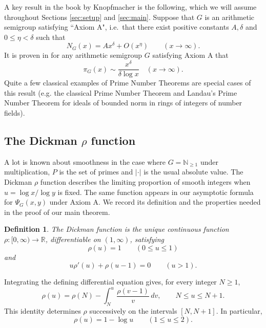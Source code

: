 \documentclass[a4paper]{amsart}
\newtheorem{definition}{Definition}[section]
\begin{document}
        A key result in the book by Knopfmacher \cite{knopfmacher2015abstract} is the following, which we will assume throughout Sections \ref{sec:setup} and \ref{sec:main}. Suppose that $G$ is an arithmetic semigroup satisfying ``Axiom A", i.e.\ that there exist positive constants $A,\delta$ and $0\leq \eta < \delta$ such that 
        \begin{equation}\label{axiom}
        N_G(x) = Ax^{\delta} + O(x^{\eta})\qquad(x\to\infty).
        \end{equation}
        It is proven in \cite[Chapter VI]{knopfmacher2015abstract} for any arithmetic semigroup $G$ satisfying Axiom A that
        \begin{equation}\label{primecounting}
    \pi_G(x)\sim\frac{x^\delta}{\delta\log x}\quad(x\rightarrow\infty).
        \end{equation}
        Quite a few classical examples of Prime Number Theorems are special cases of this result (e.g. the classical Prime Number Theorem and Landau's Prime Number Theorem \cite{landau2010einfuhrung} for ideals of bounded norm in rings of integers of number fields).

\subsection{The Dickman \texorpdfstring{$\rho$}{rho} function}
A lot is known about smoothness in the case where $G = \mathbb{N}_{\geq 1}$ under multiplication, $P$ is the set of primes and $|\cdot|$ is the usual absolute value.
The Dickman $\rho$ function describes the limiting proportion of smooth integers when $u=\log x/\log y$ is fixed. The same function appears in our asymptotic formula for $\Psi_G(x,y)$ under Axiom A. We record its definition and the properties needed in the proof of our main theorem.
\begin{definition}\label{def:dickman}
The Dickman function is the unique continuous function
$\rho:[0,\infty)\to\mathbb R$, differentiable on
$(1,\infty)$, satisfying
\[
\rho(u)=1\qquad(0\le u\le1)
\]
and
\[
u\rho'(u)+\rho(u-1)=0\qquad(u>1).
\]
\end{definition}

Integrating the defining differential equation gives,
for every integer $N\ge1$,
\begin{equation}\label{rho-recursion}
\rho(u)
=
\rho(N)-\int_N^u\frac{\rho(v-1)}{v}\,dv,
\qquad N\le u\le N+1.
\end{equation}
This identity determines $\rho$ successively on the
intervals $[N,N+1]$. In particular,
\[
\rho(u)=1-\log u\qquad(1\le u\le2).
\]
\end{document}
